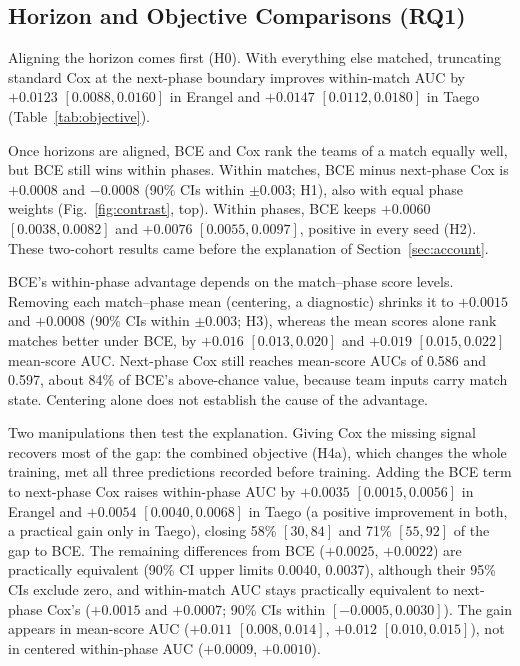 \documentclass[sigconf,anonymous]{acmart}
\begin{document}
\subsection{Horizon and Objective Comparisons (RQ1)}
\label{sec:results:rq1}

Aligning the horizon comes first (H0). With everything else matched, truncating standard Cox at the next-phase boundary improves within-match AUC by $+0.0123$ $[0.0088,\allowbreak 0.0160]$ in Erangel and $+0.0147$ $[0.0112,\allowbreak 0.0180]$ in Taego (Table~\ref{tab:objective}).

Once horizons are aligned, BCE and Cox rank the teams of a match equally well, but BCE still wins within phases. Within matches, BCE minus next-phase Cox is $+0.0008$ and $-0.0008$ (90\% CIs within $\pm0.003$; H1), also with equal phase weights (Fig.~\ref{fig:contrast}, top). Within phases, BCE keeps $+0.0060$ $[0.0038,\allowbreak 0.0082]$ and $+0.0076$ $[0.0055,\allowbreak 0.0097]$, positive in every seed (H2). These two-cohort results came before the explanation of Section~\ref{sec:account}.

BCE's within-phase advantage depends on the match--phase score levels. Removing each match--phase mean (centering, a diagnostic) shrinks it to $+0.0015$ and $+0.0008$ (90\% CIs within $\pm0.003$; H3), whereas the mean scores alone rank matches better under BCE, by $+0.016$ $[0.013,\allowbreak 0.020]$ and $+0.019$ $[0.015,\allowbreak 0.022]$ mean-score AUC. Next-phase Cox still reaches mean-score AUCs of 0.586 and 0.597, about 84\% of BCE's above-chance value, because team inputs carry match state. Centering alone does not establish the cause of the advantage.

Two manipulations then test the explanation. Giving Cox the missing signal recovers most of the gap: the combined objective (H4a), which changes the whole training, met all three predictions recorded before training. Adding the BCE term to next-phase Cox raises within-phase AUC by $+0.0035$ $[0.0015,\allowbreak 0.0056]$ in Erangel and $+0.0054$ $[0.0040,\allowbreak 0.0068]$ in Taego (a positive improvement in both, a practical gain only in Taego), closing 58\% $[30,\allowbreak 84]$ and 71\% $[55,\allowbreak 92]$ of the gap to BCE. The remaining differences from BCE ($+0.0025$, $+0.0022$) are practically equivalent (90\% CI upper limits 0.0040, 0.0037), although their 95\% CIs exclude zero, and within-match AUC stays practically equivalent to next-phase Cox's ($+0.0015$ and $+0.0007$; 90\% CIs within $[-0.0005,\allowbreak 0.0030]$). The gain appears in mean-score AUC ($+0.011$ $[0.008,\allowbreak 0.014]$, $+0.012$ $[0.010,\allowbreak 0.015]$), not in centered within-phase AUC ($+0.0009$, $+0.0010$).
\end{document}
